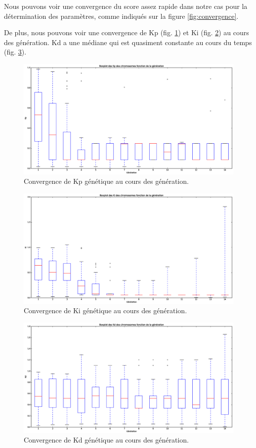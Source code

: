 \documentclass[a4paper,10pt]{report}
\begin{document}
Nous pouvons voir une convergence du score assez rapide dans notre cas pour la détermination des paramètres, comme indiqués sur la figure \ref{fig:convergence}.

De plus, nous pouvons voir une convergence de Kp (fig. \ref{fig:kpbox}) et Ki (fig. \ref{fig:kibox}) au cours des génération. Kd a une médiane qui est quasiment constante au cours du temps (fig. \ref{fig:kdbox}).

\begin{figure}[hb!]
   \centering
   \includegraphics[scale=0.35]{KpBoxplot.eps}
    \caption{\label{fig:kpbox} Convergence de Kp génétique au cours des génération.}
\end{figure}
\begin{figure}[hb!]
   \centering
   \includegraphics[scale=0.35]{KiBoxplot.eps}
    \caption{\label{fig:kibox} Convergence de Ki génétique au cours des génération.}
\end{figure}
\begin{figure}[hb!]
   \centering
   \includegraphics[scale=0.35]{KdBoxplot.eps}
    \caption{\label{fig:kdbox} Convergence de Kd génétique au cours des génération.}
\end{figure}
\end{document}
